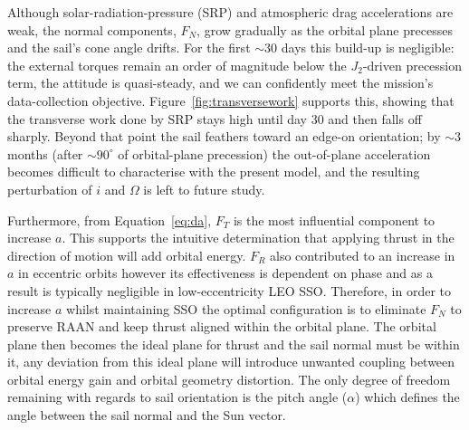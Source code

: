 \documentclass[final,3p,times,twocolumn]{elsarticle}
\begin{document}
\vspace{5pt}
\par\noindent Although solar-radiation-pressure (SRP) and atmospheric drag accelerations are weak, the normal components, \( F_N \), grow gradually as the orbital plane precesses and the sail’s cone angle drifts.  For the first \( \sim30 \) days this build-up is negligible: the external torques remain an order of magnitude below the \( J_2 \)-driven precession term, the attitude is quasi-steady, and we can confidently meet the mission’s data-collection objective.  Figure~\ref{fig:transversework} supports this, showing that the transverse work done by SRP stays high until day 30 and then falls off sharply.  Beyond that point the sail feathers toward an edge-on orientation; by \( \sim 3 \) months (after \( \sim 90^\circ \) of orbital-plane precession) the out-of-plane acceleration becomes difficult to characterise with the present model, and the resulting perturbation of \( i \) and \( \Omega \) is left to future study.

\vspace{5pt}
\par\noindent Furthermore, from Equation~\eqref{eq:da}, \( F_T \) is the most influential component to increase \( a \). This supports the intuitive determination that applying thrust in the direction of motion will add orbital energy. \( F_R \) also contributed to an increase in \( a \) in eccentric orbits however its effectiveness is dependent on phase and as a result is typically negligible in low-eccentricity LEO SSO. Therefore, in order to increase \( a \) whilst maintaining SSO the optimal configuration is to eliminate \( F_N \) to preserve RAAN and keep thrust aligned within the orbital plane. The orbital plane then becomes the ideal plane for thrust and the sail normal must be within it, any deviation from this ideal plane will introduce unwanted coupling between orbital energy gain and orbital geometry distortion. The only degree of freedom remaining with regards to sail orientation is the pitch angle (\( \alpha \)) which defines the angle between the sail normal and the Sun vector.





\end{document}
